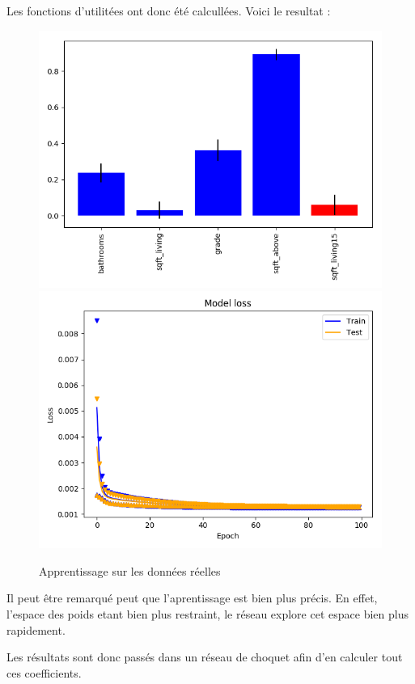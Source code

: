 Les fonctions d'utilitées ont donc été calcullées.
Voici le resultat :
\begin{figure}[H]
    \center
    \includegraphics[height=\petit]{pict/real/resut.png}
    \includegraphics[height=\petit]{pict/real/learnut.png}
	\caption{Apprentissage sur les données réelles}
	\label{fig:ut1_100_100}
\end{figure}
Il peut être remarqué peut que l'aprentissage est bien plus précis.
En effet, l'espace des poids etant bien plus restraint,
le réseau explore cet espace bien plus rapidement.


Les résultats sont donc passés dans un réseau de choquet afin d'en calculer tout ces coefficients.

